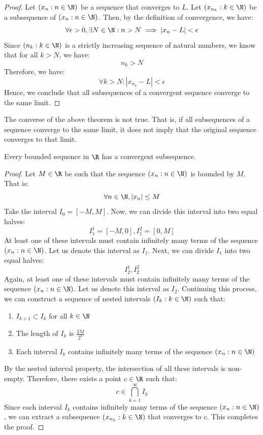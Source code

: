 \documentclass[openany]{book}
\begin{document}
\begin{proof}
    Let $(x_n : n \in \N)$ be a sequence that converges to $L$. Let $(x_{n_k} : k \in \N)$ be a subsequence of $(x_n : n \in \N)$. Then, by the definition of convergence, we have:
    $$\forall \epsilon > 0, \exists N \in \N: n > N \implies |x_n - L| < \epsilon$$
    Since $(n_k : k \in \N)$ is a strictly increasing sequence of natural numbers, we know that for all $k > N$, we have:
    $$n_k > N$$
    Therefore, we have:
    $$\forall k > N: |x_{n_k} - L| < \epsilon$$
    Hence, we conclude that all subsequences of a convergent sequence converge to the same limit.
\end{proof}
\begin{mynote}
    The converse of the above theorem is not true. That is, if all subsequences of a sequence converge to the same limit, it does not imply that the original sequence converges to that limit.
\end{mynote}
\begin{mytheorem}
    Every bounded sequence in $\R$ has a convergent subsequence.
\end{mytheorem}
\begin{proof}
    Let $M \in \R$ be such that the sequence $(x_n : n \in \N)$ is bounded by $M$. That is:
    $$\forall n \in \N, |x_n| \leq M$$
    Take the interval $I_0 = [-M, M]$. Now, we can divide this interval into two equal halves:
    $$I_1^1 = [-M, 0], I_1^2 = [0, M]$$
    At least one of these intervals must contain infinitely many terms of the sequence $(x_n : n \in \N)$. Let us denote this interval as $I_1$. Next, we can divide $I_1$ into two equal halves:
    $$I_2^1, I_2^2$$
    Again, at least one of these intervals must contain infinitely many terms of the sequence $(x_n : n \in \N)$. Let us denote this interval as $I_2$. Continuing this process, we can construct a sequence of nested intervals $(I_k : k \in \N)$ such that:
    \begin{enumerate}
        \item $I_{k+1} \subset I_k$ for all $k \in \N$
        \item The length of $I_k$ is $\frac{2M}{2^k}$
        \item Each interval $I_k$ contains infinitely many terms of the sequence $(x_n : n \in \N)$
    \end{enumerate}
    By the nested interval property, the intersection of all these intervals is non-empty. Therefore, there exists a point $c \in \R$ such that:
    $$c \in \bigcap_{k=1}^{\infty} I_k$$
    Since each interval $I_k$ contains infinitely many terms of the sequence $(x_n : n \in \N)$, we can extract a subsequence $(x_{n_k} : k \in \N)$ that converges to $c$. This completes the proof.
\end{proof}
\end{document}
